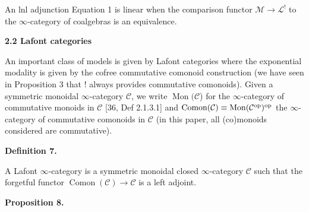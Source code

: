 
An lnl adjunction Equation 1 is linear when the comparison functor ${\mathcal{M}}\to{\mathcal{L}}^{\mathop{!}}$ to the $\infty$-category of coalgebras is an equivalence.\par
 
 
 
 
 
 
\par\medskip\noindent\textbf{2.2 Lafont categories}\par
 
 
An important class of models is given by Lafont categories where the exponential modality is given by the cofree commutative comonoid construction (we have seen in Proposition 3 that $\mathop{!}$ always provides commutative comonoids). Given a symmetric monoidal $\infty$-category ${\mathcal{C}}$, we write $\operatorname{Mon}({\mathcal{C}}$) for the $\infty$-category of commutative monoids in ${\mathcal{C}}$ [36, Def 2.1.3.1] and $\operatorname{Comon}({\mathcal{C}})\equiv\operatorname{Mon}({\mathcal{C}}^{\textnormal{op}})^{\textnormal{op}}$ the $\infty$-category of commutative comonoids in ${\mathcal{C}}$ (in this paper, all (co)monoids considered are commutative).\par
 
 
 
\par\medskip\noindent\textbf{Definition 7.}\par
 
 
A Lafont $\infty$-category is a symmetric monoidal closed $\infty$-category ${\mathcal{C}}$ such that the forgetful functor $\operatorname{Comon}({\mathcal{C}})\to{\mathcal{C}}$ is a left adjoint.\par
 
 
 
 
\par\medskip\noindent\textbf{Proposition 8.}\par
 

